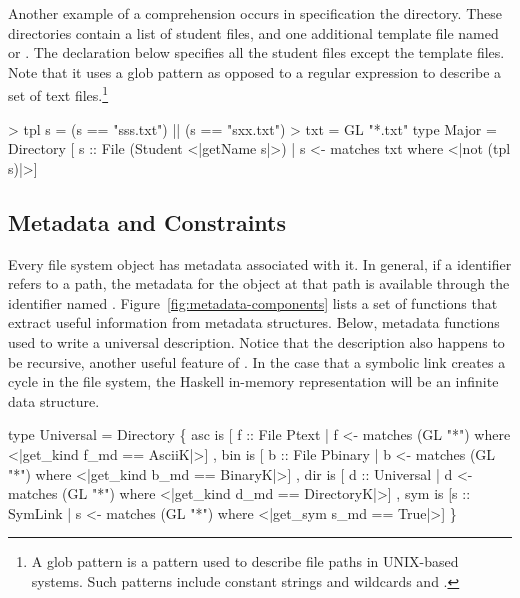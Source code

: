 \documentclass[natbib]{sigplanconf}
\begin{document}
Another example of a comprehension occurs in specification the  
directory.  These directories contain a list of student files, and one additional
template file named  or .  The declaration below
specifies all the student files except the template files.  Note that it uses
a glob pattern as opposed to a regular expression
to describe a set of text files.\footnote{A glob pattern
is a pattern used to describe file paths in UNIX-based systems.  Such patterns include
constant strings and wildcards \cd{*} and .} 
\begin{code}
> tpl s = (s == "sss.txt") || (s == "sxx.txt")
> txt = GL "*.txt"
\mbox{}
type Major = Directory  
  [ s :: File (Student <|getName s|>) 
  | s <- matches txt where <|not (tpl s)|>]
\end{code}

\subsection{Metadata and Constraints}
\label{sec:constraints}



Every file system object has metadata associated with it.  In general,
if a \forest{} identifier  refers to a path, the metadata for the object at that
path is available through the identifier named . Figure~\ref{fig:metadata-components}
lists a set of functions that extract useful information from metadata structures.
Below, metadata functions used to write a universal description.
Notice that the description also happens to be recursive, another useful feature of
\forest{}.  In the case that a symbolic link creates a cycle in the file system, the Haskell
in-memory representation will be an infinite data structure. 
\begin{code}
type Universal = Directory 
  \{ asc is [ f :: File Ptext   
           | f <- matches (GL "*") 
           where <|get_kind f_md == AsciiK|>]
  , bin is [ b :: File Pbinary
           | b <- matches (GL "*") 
           where <|get_kind b_md == BinaryK|>]
  , dir is [ d :: Universal  
           | d <- matches (GL "*") 
           where <|get_kind d_md == DirectoryK|>]
  , sym is [s :: SymLink      
           | s <- matches (GL "*") 
           where <|get_sym s_md == True|>]
  \}
\end{code}
\end{document}
